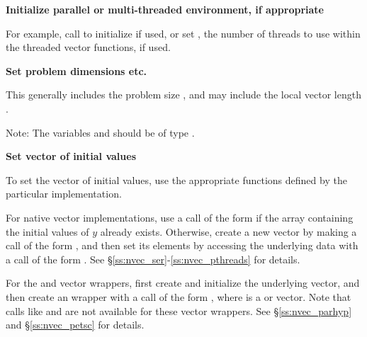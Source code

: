 \begin{Steps}
  
\item 
  {\bf Initialize parallel or multi-threaded environment, if appropriate}

  For example, call  to initialize {\mpi} if used, or
  set , the number of threads to use within the threaded
  vector functions, if used.
 
\item
  {\bf Set problem dimensions etc.}

  This generally includes the problem size , and may include
  the local vector length .

  Note: The variables  and  should be of type .

\item
  {\bf Set vector of initial values}
 
  To set the vector  of initial values, use the appropriate
  functions defined by the particular {\nvector} implementation. 
  
  For native {\sundials} vector implementations, use a call 
  of the form  if the  array 
   containing the initial values of $y$ already exists.
  Otherwise, create a new vector by making a call of the form
  , and then set its elements by accessing 
  the underlying data with a call of the form 
  .
  See \S\ref{ss:nvec_ser}-\ref{ss:nvec_pthreads} for details.
  
  For the {\hypre} and {\petsc} vector wrappers, first create and initialize 
  the underlying vector, and then create an {\nvector} wrapper with a call 
  of the form , where  is a {\hypre}
  or {\petsc} vector. Note that calls like  and 
   are not available for these vector wrappers.
  See \S\ref{ss:nvec_parhyp} and \S\ref{ss:nvec_petsc} for details.
  


\end{Steps}
